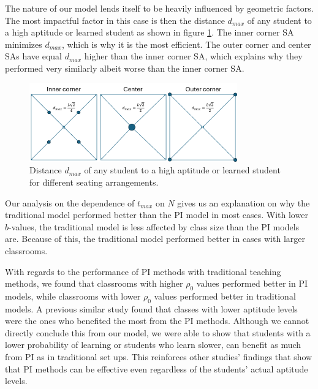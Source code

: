 The nature of our model lends itself to be heavily influenced by geometric factors. 
The most impactful factor in this case is then the distance $d_{max}$ of any student to a high aptitude or learned student as shown in figure \ref{fig:SA dmax}. 
The inner corner SA minimizes $d_{max}$, which is why it is the most efficient. 
The outer corner and center SAs have equal $d_{max}$ higher than the inner corner SA, which explains why they performed very similarly albeit worse than the inner corner SA.

\begin{figure}[htbp!]
    \centering
    \includegraphics[width=0.8\textwidth]{figures/SA dmax.png}
    \caption{Distance $d_{max}$ of any student to a high aptitude or learned student for different seating arrangements.}
    \label{fig:SA dmax}
\end{figure}

Our analysis on the dependence of $t_{max}$ on $N$ gives us an explanation on why the traditional model performed better than the PI model in most cases. 
With lower $b$-values, the traditional model is less affected by class size than the PI models are. 
Because of this, the traditional model performed better in cases with larger classrooms. 

With regards to the performance of PI methods with traditional teaching methods, we found that classrooms with higher $\rho_0$ values performed better in PI models, while classrooms with lower $\rho_0$ values performed better in traditional models. 
A previous similar study \cite{roxas2010seating} found that classes with lower aptitude levels were the ones who benefited the most from the PI methods. 
Although we cannot directly conclude this from our model, we were able to show that students with a lower probability of learning or students who learn slower, can benefit as much from PI as in traditional set ups. 
This reinforces other studies' findings \cite{lasry2008peer} that show that PI methods can be effective even regardless of the students' actual aptitude levels.

    
